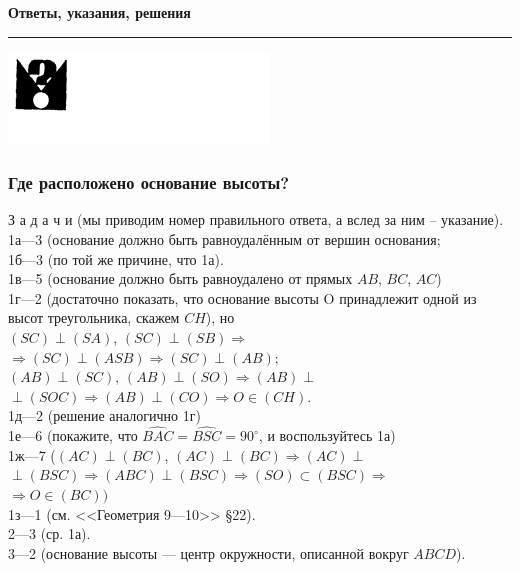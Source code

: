 \noindent\textbf{Ответы, указания, решения}\\
\rule{12cm}{0.4pt}
\begin{multicols}{2}
    \includegraphics{image.png}
    \subsubsection*{Где расположено основание высоты?}
    З а д а ч и (мы приводим номер правильного ответа, а вслед за ним -- указание).\\
    1а---3 (основание должно быть равноудалённым от вершин основания;\\
    1б---3 (по той же причине, что 1а).\\
    1в---5 (основание должно быть равноудалено от прямых $AB$, $BC$, $AC$)\\
    1г---2 (достаточно показать, что основание высоты O принадлежит одной из высот треугольника, скажем $CH$), но\\\break
    $(SC)\perp(SA)$, $(SC)\perp(SB) \Rightarrow$\\
    \mbox{}\hfill $\Rightarrow (SC)\perp(ASB)\Rightarrow(SC)\perp(AB);$\\
    $(AB)\perp(SC)$, $(AB)\perp(SO)\Rightarrow(AB)\perp$\\
    \mbox{}\hfill $\perp(SOC)\Rightarrow(AB)\perp(CO)\Rightarrow O \in(CH)$.\\\break
    1д---2 (решение аналогично 1г)\\
    1е---6 (покажите, что $\widehat{BAC}=\widehat{BSC}=90^{\circ}$, и воспользуйтесь 1а)\\
    1ж---7 ($(AC)\perp(BC)$, $(AC)\perp(BC)\Rightarrow(AC)\perp$\\
    $\perp(BSC)\Rightarrow(ABC)\perp(BSC)\Rightarrow(SO)\subset(BSC)\Rightarrow$\\
    $\Rightarrow O \in (BC))$\\
    1з---1 (см. <<Геометрия 9---10>> \S 22).\\
    2---3 (ср. 1а).\\
    3---2 (основание высоты --- центр окружности, описанной вокруг $ABCD$).\\\break

\end{multicols}
